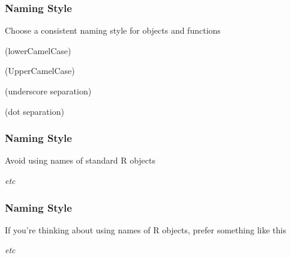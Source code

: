 \documentclass[12pt]{beamer}\usepackage[]{graphicx}\usepackage[]{color}
\begin{document}

\begin{frame}
\begin{center}
\Huge{}
\end{center}
\end{frame}


\begin{frame}[fragile]
\frametitle{Naming Style}

Choose a consistent naming style for objects and functions
\bbi
  \item {} (lowerCamelCase)
  \item {} (UpperCamelCase)
  \item {} (underscore separation)
  \item {} (dot separation)
\ei

\end{frame}


\begin{frame}[fragile]
\frametitle{Naming Style}

Avoid using names of standard R objects
\bi
  \item {}
  \item {}
  \item {}
  \item {}
  \item {}
  \item {}
  \item \textit{etc}
\ei

\end{frame}


\begin{frame}[fragile]
\frametitle{Naming Style}

If you're thinking about using names of R objects, prefer something like this
\bi
  \item {}
  \item {}
  \item {}
  \item {}
  \item {}
  \item {}
  \item \textit{etc}
\ei

\end{frame}
\end{document}

